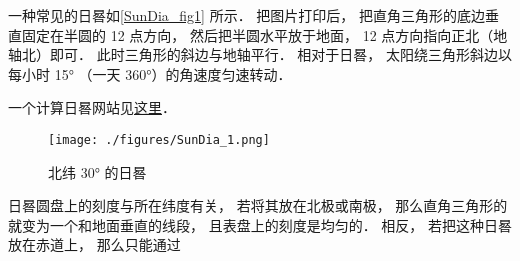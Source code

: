 

一种常见的日晷如\autoref{SunDia_fig1} 所示． 把图片打印后， 把直角三角形的底边垂直固定在半圆的 12 点方向， 然后把半圆水平放于地面， 12 点方向指向正北（地轴北）即可． 此时三角形的斜边与地轴平行． 相对于日晷， 太阳绕三角形斜边以每小时 15° （一天 360°）的角速度匀速转动．

一个计算日晷网站见\href{https://www.blocklayer.com/sundial.aspx}{这里}．
\begin{figure}[ht]
\centering
\texttt{[image: ./figures/SunDia\_1.png]}
\caption{北纬 30° 的日晷} \label{SunDia_fig1}
\end{figure}

日晷圆盘上的刻度与所在纬度有关， 若将其放在北极或南极， 那么直角三角形的就变为一个和地面垂直的线段， 且表盘上的刻度是均匀的． 相反， 若把这种日晷放在赤道上， 那么只能通过
